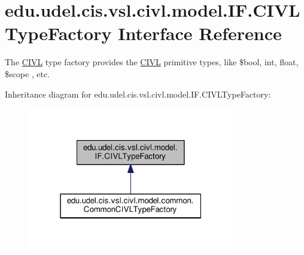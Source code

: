 \hypertarget{interfaceedu_1_1udel_1_1cis_1_1vsl_1_1civl_1_1model_1_1IF_1_1CIVLTypeFactory}{}\section{edu.\+udel.\+cis.\+vsl.\+civl.\+model.\+I\+F.\+C\+I\+V\+L\+Type\+Factory Interface Reference}
\label{interfaceedu_1_1udel_1_1cis_1_1vsl_1_1civl_1_1model_1_1IF_1_1CIVLTypeFactory}


The \hyperlink{classedu_1_1udel_1_1cis_1_1vsl_1_1civl_1_1CIVL}{C\+I\+V\+L} type factory provides the \hyperlink{classedu_1_1udel_1_1cis_1_1vsl_1_1civl_1_1CIVL}{C\+I\+V\+L} primitive types, like {\ttfamily \$bool}, {\ttfamily int}, {\ttfamily float}, {\ttfamily \$scope} , etc.  




Inheritance diagram for edu.\+udel.\+cis.\+vsl.\+civl.\+model.\+I\+F.\+C\+I\+V\+L\+Type\+Factory\+:
\nopagebreak
\begin{figure}[H]
\begin{center}
\leavevmode
\includegraphics[width=256pt]{interfaceedu_1_1udel_1_1cis_1_1vsl_1_1civl_1_1model_1_1IF_1_1CIVLTypeFactory__inherit__graph}
\end{center}
\end{figure}
